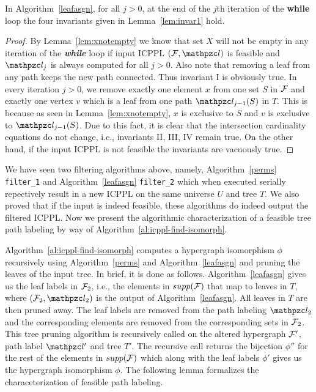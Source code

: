\begin{lemma}
  \label{lem:invar3}
  In Algorithm~\ref{leafasgn}, for all $j > 0$, at the end of the
  $j$th iteration of the {\bf while} loop the four invariants given in
  Lemma~\ref{lem:invar1} hold.
\end{lemma}
\begin{proof}
  By Lemma~\ref{lem:xnotempty} we know that set $X$ will not be empty
  in any iteration of the {\em \bf while} loop if input ICPPL $(\cF,
  \cl)$ is feasible and $\cl_j$ is always computed for all $j >
  0$. Also note that removing a leaf from any path keeps the new path
  connected. Thus invariant I is obviously true. In every iteration $j
  > 0$, we remove exactly one element $x$ from one set $S$ in ${\cal F}$
  and exactly one vertex $v$ which is a leaf from one path
  $\cl_{j-1}(S)$ in $T$. This is because as seen in
  Lemma~\ref{lem:xnotempty}, $x$ is exclusive to $S$ and $v$ is
  exclusive to $\cl_{j-1}(S)$. Due to this fact, it is clear that the
  intersection cardinality equations do not change, i.e., invariants
  II, III, IV remain true. On the other hand, if the input ICPPL is
  not feasible the invariants are vacuously true. %
\end{proof}



We have seen two filtering algorithms above, namely,
Algorithm~\ref{perms} {\tt filter\_1} and Algorithm~\ref{leafasgn}
{\tt filter\_2} which when executed serially repectively result in a
new ICPPL on the same universe $U$ and tree $T$. We also proved that
if the input is indeed feasible, these algorithms do indeed output the
filtered ICPPL. Now we present the algorithmic characterization of a
feasible tree path labeling by way of
Algorithm~\ref{al:icppl-find-isomorph}.

Algorithm~\ref{al:icppl-find-isomorph} computes a hypergraph
isomorphism $\phi$ recursively using Algorithm~\ref{perms} and
Algorithm~\ref{leafasgn} and pruning the leaves of the input tree. In
brief, it is done as follows. Algorithm~\ref{leafasgn} gives us the
leaf labels in ${\cal F}_2$, i.e., the elements in $supp({\cal F})$ that map to
leaves in $T$, where $(\cF_2, \cl_2)$ is the output of
Algorithm~\ref{leafasgn}. All leaves in $T$ are then pruned away. The
leaf labels are removed from the path labeling $\cl_2$ and the
corresponding elements are removed from the corresponding sets in
${\cal F}_2$. This tree pruning algorithm is recursively called on the
altered hypergraph ${\cal F}'$, path label $\cl'$ and tree $T'$. The
recursive call returns the bijection $\phi''$ for the rest of the
elements in $supp({\cal F})$ which along with the leaf labels $\phi'$ gives
us the hypergraph isomorphism $\phi$.  The following lemma formalizes
the characeterization of feasible path labeling.

